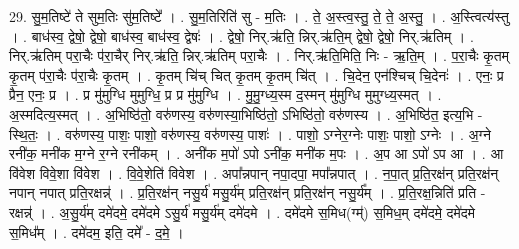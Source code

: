 \documentclass[17pt]{extarticle}
\begin{document}
29. सु॒म॒तिष्टे॑ ते सुम॒तिः सु॑म॒तिष्टे᳚ । . सु॒म॒तिरिति॑ सु - म॒तिः । . ते॒ अ॒स्त्व॒स्तु॒ ते॒ ते॒ अ॒स्तु॒ । . अ॒स्त्वित्य॑स्तु । . बाध॑स्व॒ द्वेषो॒ द्वेषो॒ बाध॑स्व॒ बाध॑स्व॒ द्वेषः॑ । . द्वेषो॒ निर्.ऋ॑ति॒ न्निर्.ऋ॑ति॒म् द्वेषो॒ द्वेषो॒ निर्.ऋ॑तिम् । . निर्.ऋ॑तिम् परा॒चैः प॑रा॒चैर् निर्.ऋ॑ति॒ न्निर्.ऋ॑तिम् परा॒चैः । . निर्.ऋ॑ति॒मिति॒ निः - ऋ॒ति॒म् । . प॒रा॒चैः कृ॒तम् कृ॒तम् प॑रा॒चैः प॑रा॒चैः कृ॒तम् । . कृ॒तम् चि॑च् चित् कृ॒तम् कृ॒तम् चि॑त् । . चि॒देन॒ एन॑श्चिच् चि॒देनः॑ । . एनः॒ प्र प्रैन॒ एनः॒ प्र । . प्र मु॑मुग्धि मुमुग्धि॒ प्र प्र मु॑मुग्धि । . मु॒मु॒ग्ध्य॒स्म द॒स्मन् मु॑मुग्धि मुमुग्ध्य॒स्मत् । . अ॒स्मदित्य॒स्मत् । . अ॒भिष्ठि॑तो॒ वरु॑णस्य॒ वरु॑णस्या॒भिष्ठि॑तो॒ ऽभिष्ठि॑तो॒ वरु॑णस्य । . अ॒भिष्ठि॑त॒ इत्य॒भि - स्थि॒तः॒ । . वरु॑णस्य॒ पाशः॒ पाशो॒ वरु॑णस्य॒ वरु॑णस्य॒ पाशः॑ । . पाशो॒ ऽग्नेर॒ग्नेः पाशः॒ पाशो॒ ऽग्नेः । . अ॒ग्ने रनी॑क॒ मनी॑क म॒ग्ने र॒ग्ने रनी॑कम् । . अनी॑क म॒पो॑ ऽपो ऽनी॑क॒ मनी॑क म॒पः । . अ॒प आ ऽपो॑ ऽप आ । . आ वि॑वेश विवे॒शा वि॑वेश । . वि॒वे॒शेति॑ विवेश । . अपा᳚न्नपान् नपा॒दपा॒ मपा᳚न्नपात् । . न॒पा॒त् प्र॒ति॒रक्ष॑न् प्रति॒रक्ष॑न् नपान् नपात् प्रति॒रक्षन्न्॑ । . प्र॒ति॒रक्ष॑न् नसु॒र्य॑ मसु॒र्य॑म् प्रति॒रक्ष॑न् प्रति॒रक्ष॑न् नसु॒र्य᳚म् । . प्र॒ति॒रक्ष॒न्निति॑ प्रति - रक्षन्न्॑ । . अ॒सु॒र्य॑म् दमे॑दमे॒ दमे॑दमे ऽसु॒र्य॑ मसु॒र्य॑म् दमे॑दमे । . दमे॑दमे स॒मिध(ग्म्॑) स॒मिध॒म् दमे॑दमे॒ दमे॑दमे स॒मिध᳚म् । . दमे॑दम॒ इति॒ दमे᳚ - द॒मे॒ । \newline
\end{document}
